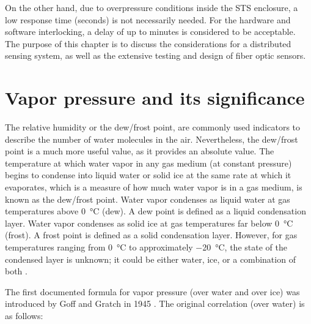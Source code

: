 On the other hand, due to overpressure conditions inside the \gls{STS} enclosure, a low response time (seconds) is not necessarily needed. For the hardware and software interlocking, a delay of up to minutes is considered to be acceptable. The purpose of this chapter is to discuss the considerations for a distributed sensing system, as well as the extensive testing and design of fiber optic sensors. 
\section{Vapor pressure and its significance}

The relative humidity or the dew/frost point, are commonly used indicators to describe the number of water molecules in the air. Nevertheless, the dew/frost point is a much more useful value, as it provides an absolute value. The temperature at which water vapor in any gas medium (at constant pressure) begins to condense into liquid water or solid ice at the same rate at which it evaporates, which is a measure of how much water vapor is in a gas medium, is known as the dew/frost point. Water vapor condenses as liquid water at gas temperatures above \SI{0}{\celsius} (dew). A dew point is defined as a liquid condensation layer. Water vapor condenses as solid ice at gas temperatures far below \SI{0}{\celsius} (frost). A frost point is defined as a solid condensation layer. However, for gas temperatures ranging from \SI{0}{\celsius} to approximately \SI{-20}{\celsius}, the state of the condensed layer is unknown; it could be either water, ice, or a combination of both \cite{nie_dewpoint}. 


The first documented formula for vapor pressure (over water and over ice) was introduced by Goff and Gratch in 1945 \cite{goff_gratch}. The original correlation (over water) is as follows:

